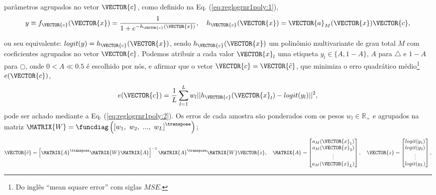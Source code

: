 \begin{theorem}
\begin{minipage}{0.55\textwidth}
parâmetros agrupados no vetor $\VECTOR{c}$,
como definido na Eq. (\ref{eq:reglogrnr1poly:1}),
\begin{equation}\label{eq:reglogrnr1poly:1}
y\equiv f_{\VECTOR{c}}(\VECTOR{x})= \frac{1}{1+e^{-h_{\VECTOR{c}}(\VECTOR{x})}},
\quad h_{\VECTOR{c}}(\VECTOR{x})=\VECTOR{a}_M(\VECTOR{x})\VECTOR{c},
\end{equation}
\end{minipage}
ou seu equivalente: $logit(y)=h_{\VECTOR{c}}(\VECTOR{x})$,
sendo $h_{\VECTOR{c}}(\VECTOR{x})$ um polinômio multivariante de grau total $M$ 
\cite[pp. 47]{geddes2007algorithms} \cite[pp. 108]{zippel2012effective}
com coeficientes agrupados no vetor $\VECTOR{c}$.
Podemos atribuir a cada valor $\VECTOR{x}_l$ uma etiqueta $y_l\in \{A,1-A\}$, 
$A$ para $\bigtriangleup$ e  $1-A$ para $\bigcirc$,
onde $0<A\ll 0.5$ é escolhido por nós,
e afirmar que o vetor $\VECTOR{c}= \VECTOR{\hat{c}}$,
que minimiza o erro quadrático médio\footnote{Do inglês ``mean square error'' com siglas $MSE$.} $e(\VECTOR{c})$,
\begin{equation}\label{eq:reglogrnr1poly:1e}
e(\VECTOR{c}) =  \frac{1}{L}\sum_{l=1}^{L} w_l||h_{\VECTOR{c}}(\VECTOR{x}_l)-logit(y_l)||^2,
\end{equation}
pode ser achado mediante a Eq. (\ref{eq:reglogrnr1poly:2}).
Os erros de cada amostra são ponderados com os pesos $w_l \in \mathbb{R}_+$ e
agrupados na matriz  $\MATRIX{W}=\funcdiag \left( \left[w_1,~ w_2,~ ...,~ w_L \right]^{\transpose} \right) $;
\begin{equation}\label{eq:reglogrnr1poly:2}
\VECTOR{\hat{c}} =  \left[ \MATRIX{A}^{\transpose} \MATRIX{W}\MATRIX{A}\right]^{-1} \MATRIX{A}^{\transpose} \MATRIX{W}\VECTOR{z},
\quad
\MATRIX{A}=
\begin{bmatrix}
a_M(\VECTOR{x}_1)\\
a_M(\VECTOR{x}_2)\\
\vdots\\
a_M(\VECTOR{x}_L)\\ 
\end{bmatrix},
\quad
\VECTOR{z}=
\begin{bmatrix}
logit(y_1)  \\
logit(y_2)  \\
\vdots \\
logit(y_L) \\
\end{bmatrix},

\end{equation}
\end{theorem}
